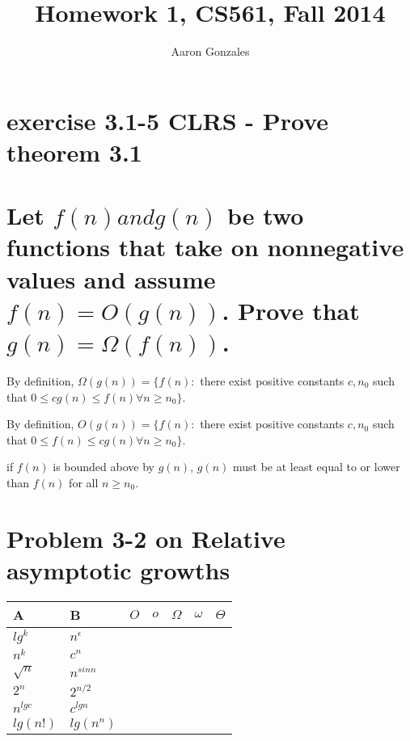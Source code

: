 \documentclass[titlepage]{article}\usepackage[]{graphicx}\usepackage[]{color}
\begin{document}
\title{Homework 1, CS561, Fall 2014}
\author{Aaron Gonzales}
\maketitle




\section{ exercise 3.1-5 CLRS - Prove theorem 3.1}


\section{ Let $f(n) and g(n)$ be two functions that take on nonnegative values and
assume $f(n) = O(g(n))$. Prove that $g(n) =\Omega(f(n))$.}

By definition, $\Omega(g(n)) = \{ f(n) : $ there exist positive constants $c, n_0$
such that $0 \leq cg(n) \leq f(n) \forall  n \geq n_0\}$.

By definition, $O(g(n)) = \{ f(n) : $ there exist positive constants $c, n_0$
such that $0 \leq f(n) \leq cg(n) \forall  n \geq n_0\}$.

if $f(n)$ is bounded above by $g(n)$, $g(n)$ must be at least equal to or
lower than $f(n)$ for all $n \geq n_0$.





\section{ Problem 3-2 on Relative asymptotic growths}
\begin{table}[h]
  \begin{tabular}{ll|l|l|l|l|l}
	A & B  & $O$  & $o$  & $\Omega$  & $\omega$  & $\Theta$  \\ \hline	
	$lg^k $&  $n^\epsilon$   &  &  &  &  &  \\ \hline	
	$n^k$     & $c^n$  &  &  &  &  &  \\ \hline	
	$\sqrt{n}$ & $n^{sin n}$     &  &  &  &  &  \\ \hline	
	$2^n$      & $2^{n/2}$  &  &  &  &  &  \\ \hline	
	$n^{lg c}$     & $c^{lg n}$  &  &  &  &  &  \\ \hline	
	$lg(n!)$     &  $lg(n^n)$ &  &  &  &  &  
  \end{tabular}
\end{table}
\end{document}
